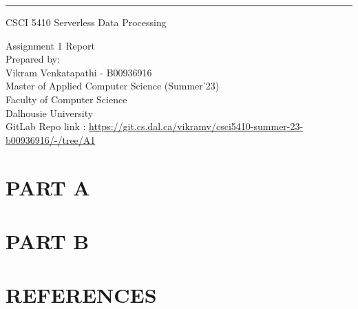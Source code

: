 \documentclass{scrreprt}
\date{\today}
\begin{document}
\begin{center}
  \rule{17cm}{5pt}\vskip1cm
  \begin{bfseries}
    \Large{CSCI 5410 Serverless Data Processing}\\
    \vspace{1.5cm}

    \vspace{1.5cm}

    \vspace{1.5cm}
    \Huge{Assignment 1 Report}\\
    \vspace{1.5cm}
    \LARGE{Prepared by: \\Vikram Venkatapathi - B00936916\\}
    \vspace{1.5cm}
    \vspace{1.5cm}
    \Large{Master of Applied Computer Science (Summer'23)\\
      Faculty of Computer Science\\
      Dalhousie University\\
      \vspace{3cm}
      GitLab Repo link : \url{https://git.cs.dal.ca/vikramv/csci5410-summer-23-b00936916/-/tree/A1}
    }
  \end{bfseries}
\end{center}



\newpage
{}

\newpage
{}
{}
\tableofcontents
\newpage
{}



\newpage
{}
\part{PART A}

\part{PART B}

\appendix

\part{REFERENCES}

% 
% 
\end{document}
